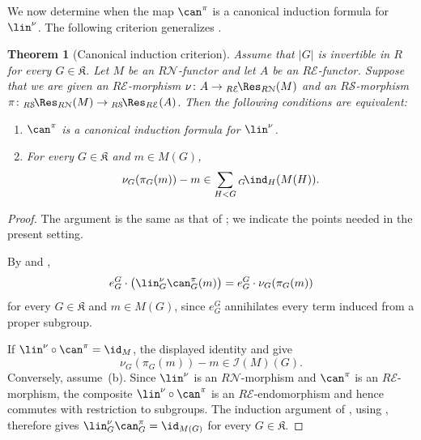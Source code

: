 \documentclass{amsart}
\numberwithin{equation}{section}%
\newtheorem{Thm}[equation]{Theorem}
\theoremstyle{remark}
\theoremstyle{definition}
\newcommand{\cI}{\mathcal I}
\newcommand{\e}{\mathcal E}
\newcommand{\s}{\mathcal S}
\newcommand{\n}{\mathcal N}
\newcommand{\lind}[1]{{}_{#1}\!\ind}
\newcommand{\lRes}[1]{{}_{#1}\!\Res}
\begin{document}
We now determine when the map $\can^\pi$ is a
canonical induction formula for $\lin^\nu$.
The following criterion generalizes
\cite[Proposition~6.4]{Boltje98a}.
%
\begin{Thm}[Canonical induction criterion]
\label{thm:canonical-induction-criterion}
Assume that $|G|$ is invertible in $R$ for every
$G\in\mathfrak K$.
Let $M$ be an $R\n$-functor and let $A$ be an
$R\e$-functor.
Suppose that we are given an $R\e$-morphism
$\nu\colon A\to{}\lRes{R\e}_{R\n}(M)$
and an $R\s$-morphism
$\pi\colon{}\lRes{R\s}_{R\n}(M)\to
{}\lRes{R\s}_{R\e}(A)$.
Then the following conditions are equivalent:
\begin{enumerate}
\item $\can^\pi$ is a canonical induction formula
for $\lin^\nu$.
\item For every $G\in\mathfrak K$ and
$m\in M(G)$,
\[
\nu_G(\pi_G(m))-m
\in
\sum_{H<G}\lind{G}_H(M(H)).
\]
\end{enumerate}
\end{Thm}
%
\begin{proof}
The argument is the same as that of
\cite[Prop.~6.4]{Boltje98a}; we indicate the points needed in the
present setting.

By
 and
,
%
\[
e_G^G\cdot
\bigl(
\lin_G^\nu\can_G^\pi(m)
\bigr)
=
e_G^G\cdot\nu_G(\pi_G(m))
\]
%
for every $G\in\mathfrak K$ and $m\in M(G)$, since $e_G^G$
annihilates every term induced from a proper subgroup.

If $\lin^\nu\circ\can^\pi=\id_M$, the displayed identity and
 give
%
\[
\nu_G(\pi_G(m))-m\in\cI(M)(G).
\]
%
Conversely, assume~\textup{(b)}. Since $\lin^\nu$ is an
$R\n$-morphism and $\can^\pi$ is an $R\e$-morphism, the composite
$\lin^\nu\circ\can^\pi$ is an $R\e$-endomorphism and hence commutes
with restriction to subgroups. The induction argument of
\cite[Prop.~6.4]{Boltje98a}, using
, therefore gives
$\lin_G^\nu\can_G^\pi=\id_{M(G)}$
for every $G\in\mathfrak K$.
\end{proof}
%
\end{document}
